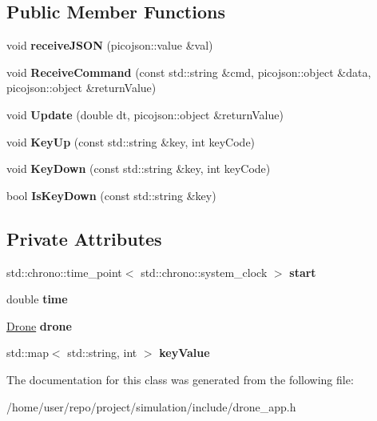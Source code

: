 \subsection*{Public Member Functions}
\begin{DoxyCompactItemize}
\item 
\mbox{\label{classDroneApp_aee08991056bca317708c4600e9bafc9d}} 
void {\bfseries receive\+J\+S\+ON} (picojson\+::value \&val)
\item 
\mbox{\label{classDroneApp_aadf6c66066f167d8bdbd0e4d69f16e31}} 
void {\bfseries Receive\+Command} (const std\+::string \&cmd, picojson\+::object \&data, picojson\+::object \&return\+Value)
\item 
\mbox{\label{classDroneApp_a9d9319844a7fe350933b7804c6972ab2}} 
void {\bfseries Update} (double dt, picojson\+::object \&return\+Value)
\item 
\mbox{\label{classDroneApp_ac551dcfe12694ab624268469652ae2f9}} 
void {\bfseries Key\+Up} (const std\+::string \&key, int key\+Code)
\item 
\mbox{\label{classDroneApp_abd3255a9783ccfbc625bfa74a50238e9}} 
void {\bfseries Key\+Down} (const std\+::string \&key, int key\+Code)
\item 
\mbox{\label{classDroneApp_a9fa8bb8d0f5d5f9ca9042ca884f29181}} 
bool {\bfseries Is\+Key\+Down} (const std\+::string \&key)
\end{DoxyCompactItemize}
\subsection*{Private Attributes}
\begin{DoxyCompactItemize}
\item 
\mbox{\label{classDroneApp_a9c5deb39fbc163bab48cca209541cf9a}} 
std\+::chrono\+::time\+\_\+point$<$ std\+::chrono\+::system\+\_\+clock $>$ {\bfseries start}
\item 
\mbox{\label{classDroneApp_a83d0cd27e1a51dd509134dd4ac3f2f0a}} 
double {\bfseries time}
\item 
\mbox{\label{classDroneApp_ac92f3a39a20ebe12ceaac923c8f356d7}} 
\hyperlink{classDrone}{Drone} {\bfseries drone}
\item 
\mbox{\label{classDroneApp_a6023eb4a0c54568a36c754b7c0fc72e0}} 
std\+::map$<$ std\+::string, int $>$ {\bfseries key\+Value}
\end{DoxyCompactItemize}


The documentation for this class was generated from the following file\+:\begin{DoxyCompactItemize}
\item 
/home/user/repo/project/simulation/include/drone\+\_\+app.\+h\end{DoxyCompactItemize}
